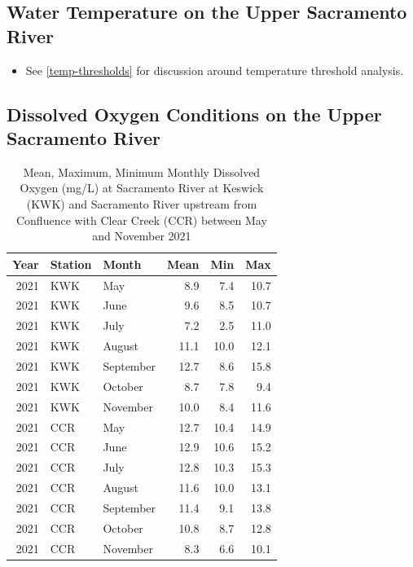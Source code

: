 \documentclass[
]{book}
\providecommand{\tightlist}{%
  \setlength{\itemsep}{0pt}\setlength{\parskip}{0pt}}
\theoremstyle{definition}
\theoremstyle{definition}
\theoremstyle{definition}
\theoremstyle{definition}
\theoremstyle{remark}
\begin{document}
\hypertarget{water-temperature-on-the-upper-sacramento-river}{%
\subsection{Water Temperature on the Upper Sacramento River}\label{water-temperature-on-the-upper-sacramento-river}}

\begin{itemize}
\tightlist
\item
  See \ref{temp-thresholds} for discussion around temperature threshold analysis.
\end{itemize}

\hypertarget{dissolved-oxygen-conditions-on-the-upper-sacramento-river}{%
\subsection{Dissolved Oxygen Conditions on the Upper Sacramento River}\label{dissolved-oxygen-conditions-on-the-upper-sacramento-river}}

\begin{table}
\centering
\caption{Mean, Maximum, Minimum Monthly Dissolved Oxygen (mg/L) at Sacramento River at Keswick (KWK) and Sacramento River upstream from Confluence with Clear Creek (CCR) between May and November 2021}
\centering
\begin{tabular}[t]{rllrrr}
\hline
Year & Station & Month & Mean & Min & Max\\
\hline
2021 & KWK & May & 8.9 & 7.4 & 10.7\\
\hline
2021 & KWK & June & 9.6 & 8.5 & 10.7\\
\hline
2021 & KWK & July & 7.2 & 2.5 & 11.0\\
\hline
2021 & KWK & August & 11.1 & 10.0 & 12.1\\
\hline
2021 & KWK & September & 12.7 & 8.6 & 15.8\\
\hline
2021 & KWK & October & 8.7 & 7.8 & 9.4\\
\hline
2021 & KWK & November & 10.0 & 8.4 & 11.6\\
\hline
2021 & CCR & May & 12.7 & 10.4 & 14.9\\
\hline
2021 & CCR & June & 12.9 & 10.6 & 15.2\\
\hline
2021 & CCR & July & 12.8 & 10.3 & 15.3\\
\hline
2021 & CCR & August & 11.6 & 10.0 & 13.1\\
\hline
2021 & CCR & September & 11.4 & 9.1 & 13.8\\
\hline
2021 & CCR & October & 10.8 & 8.7 & 12.8\\
\hline
2021 & CCR & November & 8.3 & 6.6 & 10.1\\
\hline
\end{tabular}
\end{table}
\end{document}
